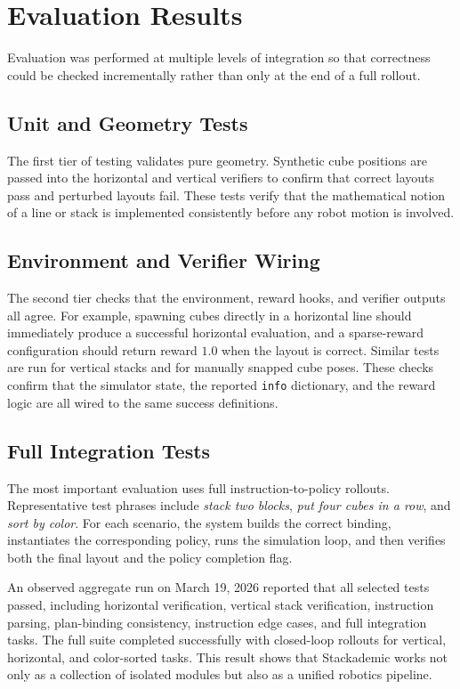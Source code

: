 \documentclass[10pt,letterpaper,twocolumn]{article}
\begin{document}
\section{Evaluation Results}
Evaluation was performed at multiple levels of integration so that correctness could be checked incrementally rather than only at the end of a full rollout.

\subsection{Unit and Geometry Tests}
The first tier of testing validates pure geometry. Synthetic cube positions are passed into the horizontal and vertical verifiers to confirm that correct layouts pass and perturbed layouts fail. These tests verify that the mathematical notion of a line or stack is implemented consistently before any robot motion is involved.

\subsection{Environment and Verifier Wiring}
The second tier checks that the environment, reward hooks, and verifier outputs all agree. For example, spawning cubes directly in a horizontal line should immediately produce a successful horizontal evaluation, and a sparse-reward configuration should return reward $1.0$ when the layout is correct. Similar tests are run for vertical stacks and for manually snapped cube poses. These checks confirm that the simulator state, the reported \texttt{info} dictionary, and the reward logic are all wired to the same success definitions.

\subsection{Full Integration Tests}
The most important evaluation uses full instruction-to-policy rollouts. Representative test phrases include \textit{stack two blocks}, \textit{put four cubes in a row}, and \textit{sort by color}. For each scenario, the system builds the correct binding, instantiates the corresponding policy, runs the simulation loop, and then verifies both the final layout and the policy completion flag.

An observed aggregate run on March 19, 2026 reported that all selected tests passed, including horizontal verification, vertical stack verification, instruction parsing, plan-binding consistency, instruction edge cases, and full integration tasks. The full suite completed successfully with closed-loop rollouts for vertical, horizontal, and color-sorted tasks. This result shows that Stackademic works not only as a collection of isolated modules but also as a unified robotics pipeline.
\end{document}
